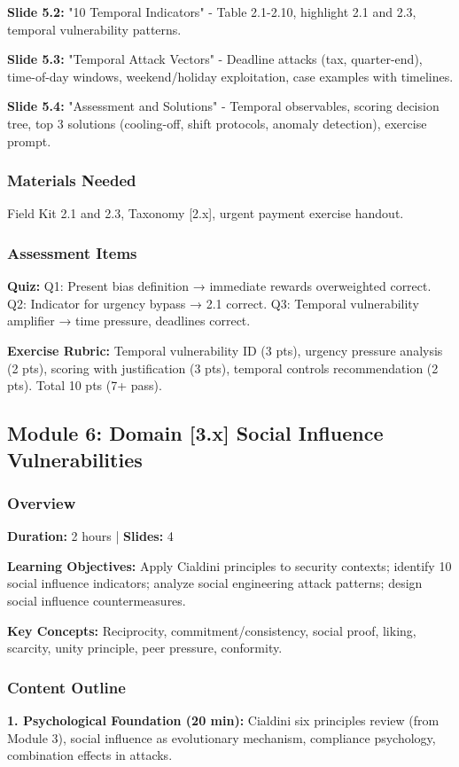 \documentclass[11pt,a4paper]{article}
\begin{document}
\textbf{Slide 5.2:} "10 Temporal Indicators" - Table 2.1-2.10, highlight 2.1 and 2.3, temporal vulnerability patterns.

\textbf{Slide 5.3:} "Temporal Attack Vectors" - Deadline attacks (tax, quarter-end), time-of-day windows, weekend/holiday exploitation, case examples with timelines.

\textbf{Slide 5.4:} "Assessment and Solutions" - Temporal observables, scoring decision tree, top 3 solutions (cooling-off, shift protocols, anomaly detection), exercise prompt.

\subsubsection{Materials Needed}
Field Kit 2.1 and 2.3, Taxonomy [2.x], urgent payment exercise handout.

\subsubsection{Assessment Items}
\textbf{Quiz:} Q1: Present bias definition → immediate rewards overweighted correct. Q2: Indicator for urgency bypass → 2.1 correct. Q3: Temporal vulnerability amplifier → time pressure, deadlines correct.

\textbf{Exercise Rubric:} Temporal vulnerability ID (3 pts), urgency pressure analysis (2 pts), scoring with justification (3 pts), temporal controls recommendation (2 pts). Total 10 pts (7+ pass).

\subsection{Module 6: Domain [3.x] Social Influence Vulnerabilities}

\subsubsection{Overview}
\textbf{Duration:} 2 hours | \textbf{Slides:} 4

\textbf{Learning Objectives:} Apply Cialdini principles to security contexts; identify 10 social influence indicators; analyze social engineering attack patterns; design social influence countermeasures.

\textbf{Key Concepts:} Reciprocity, commitment/consistency, social proof, liking, scarcity, unity principle, peer pressure, conformity.

\subsubsection{Content Outline}
\textbf{1. Psychological Foundation (20 min):} Cialdini six principles review (from Module 3), social influence as evolutionary mechanism, compliance psychology, combination effects in attacks.
\end{document}
